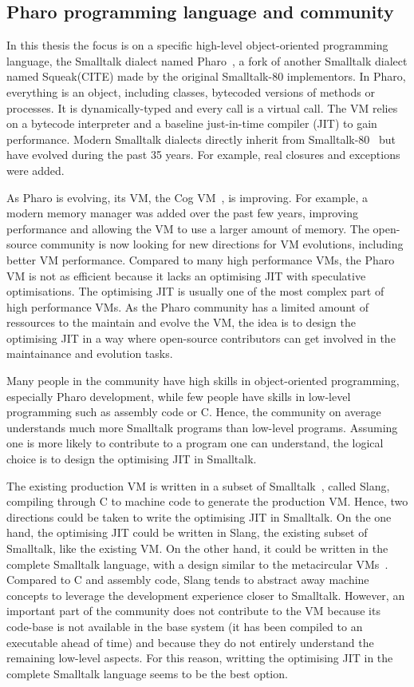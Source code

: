 \documentclass[a4paper,12pt,twoside]{../includes/ThesisStyle}
\begin{document}
\subsection{Pharo programming language and community}

In this thesis the focus is on a specific high-level object-oriented programming language, the Smalltalk dialect named Pharo~\cite{Blac09a}, a fork of another Smalltalk dialect named Squeak(CITE) made by the original Smalltalk-80 implementors. In Pharo, everything is an object, including classes, bytecoded versions of methods or processes. It is dynamically-typed and every call is a virtual call. The VM relies on a bytecode interpreter and a baseline just-in-time compiler (JIT) to gain performance. Modern Smalltalk dialects directly inherit from Smalltalk-80~\cite{Gold83a} but have evolved during the past 35 years. For example, real closures and exceptions were added.

As Pharo is evolving, its VM, the Cog VM~\cite{Mira08a}, is improving. For example, a modern memory manager was added over the past few years, improving performance and allowing the VM to use a larger amount of memory. The open-source community is now looking for new directions for VM evolutions, including better VM performance. Compared to many high performance VMs, the Pharo VM is not as efficient because it lacks an optimising JIT with speculative optimisations. The optimising JIT is usually one of the most complex part of high performance VMs. As the Pharo community has a limited amount of ressources to the maintain and evolve the VM, the idea is to design the optimising JIT in a way where open-source contributors can get involved in the maintainance and evolution tasks.

Many people in the community have high skills in object-oriented programming, especially Pharo development, while few people have skills in low-level programming such as assembly code or C. Hence, the community on average understands much more Smalltalk programs than low-level programs. Assuming one is more likely to contribute to a program one can understand, the logical choice is to design the optimising JIT in Smalltalk.

The existing production VM is written in a subset of Smalltalk~\cite{Inga97a}, called Slang, compiling through C to machine code to generate the production VM. Hence, two directions could be taken to write the optimising JIT in Smalltalk. On the one hand, the optimising JIT could be written in Slang, the existing subset of Smalltalk, like the existing VM. On the other hand, it could be written in the complete Smalltalk language, with a design similar to the metacircular VMs~\cite{Unga05b,Wimm13a,Alp99a}. Compared to C and assembly code, Slang tends to abstract away machine concepts to leverage the development experience closer to Smalltalk. However, an important part of the community does not contribute to the VM because its code-base is not available in the base system (it has been compiled to an executable ahead of time) and because they do not entirely understand the remaining low-level aspects. For this reason, writting the optimising JIT in the complete Smalltalk language seems to be the best option.
\end{document}
